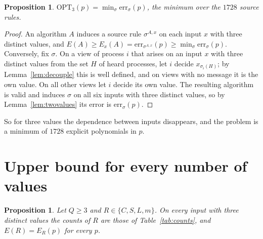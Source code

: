 \documentclass[11pt]{article}
\newtheorem{proposition}[theorem]{Proposition}
\theoremstyle{remark}
\newcommand{\OPT}{\mathrm{OPT}}
\begin{document}
\begin{proposition}\label{prop:sources}
$\OPT_3(p)=\min_\sigma \mathrm{err}_\sigma(p)$, the minimum over the $1728$ source rules.
\end{proposition}

\begin{proof}
An algorithm $A$ induces a source rule $\sigma^{A,x}$ on each input $x$ with three distinct values, and $E(A)\ge E_x(A)=\mathrm{err}_{\sigma^{A,x}}(p)\ge\min_\sigma\mathrm{err}_\sigma(p)$. Conversely, fix $\sigma$. On a view of process $i$ that arises on an input $x$ with three distinct values from the set $H$ of heard processes, let $i$ decide $x_{\sigma_i(H)}$; by Lemma~\ref{lem:decouple} this is well defined, and on views with no message it is the own value. On all other views let $i$ decide its own value. The resulting algorithm is valid and induces $\sigma$ on all six inputs with three distinct values, so by Lemma~\ref{lem:twovalues} its error is $\mathrm{err}_\sigma(p)$.
\end{proof}

So for three values the dependence between inputs disappears, and the problem is a minimum of $1728$ explicit polynomials in $p$.

\section{Upper bound for every number of values}\label{sec:upper}

\begin{proposition}\label{prop:upper}
Let $Q\ge3$ and $R\in\{C,S,L,m\}$. On every input with three distinct values the counts of $R$ are those of Table~\ref{tab:counts}, and $E(R)=E_R(p)$ for every $p$.
\end{proposition}
\end{document}
